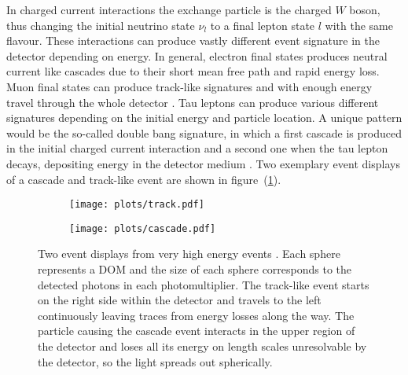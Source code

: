 In charged current interactions the exchange particle is the charged $W$ boson, thus changing the initial neutrino state $\nu_l$ to a final lepton state $l$ with the same flavour.
These interactions can produce vastly different event signature in the detector depending on energy.
In general, electron final states produces neutral current like cascades due to their short mean free path and rapid energy loss.
Muon final states can produce track-like signatures and with enough energy travel through the whole detector \cite{Katz:2011ke}.
Tau leptons can produce various different signatures depending on the initial energy and particle location.
A unique pattern would be the so-called double bang signature, in which a first cascade is produced in the initial charged current interaction and a second one when the tau lepton decays, depositing energy in the detector medium \cite{Cowen:2007NuTaus}.
Two exemplary event displays of a cascade and track-like event are shown in figure~(\ref{fig:icecube_events_topologies}).

\begin{figure}[htbp]
  \centering
  \begin{subfigure}[c]{0.49\textwidth}
    \centering
    \texttt{[image: plots/track.pdf]}
  \end{subfigure}
  \hfill
  \begin{subfigure}[c]{0.49\textwidth}
    \centering
    \texttt{[image: plots/cascade.pdf]}
  \end{subfigure}
  \caption[Two event displays from very high energy events]{
    Two event displays from very high energy events \cite{Aartsen:2013jdh}.
    Each sphere represents a DOM and the size of each sphere corresponds to the detected photons in each photomultiplier.
    The track-like event starts on the right side within the detector and travels to the left continuously leaving traces from energy losses along the way.
    The particle causing the cascade event interacts in the upper region of the detector and loses all its energy on length scales unresolvable by the detector, so the light spreads out spherically.
  }
  \label{fig:icecube_events_topologies}
\end{figure}

